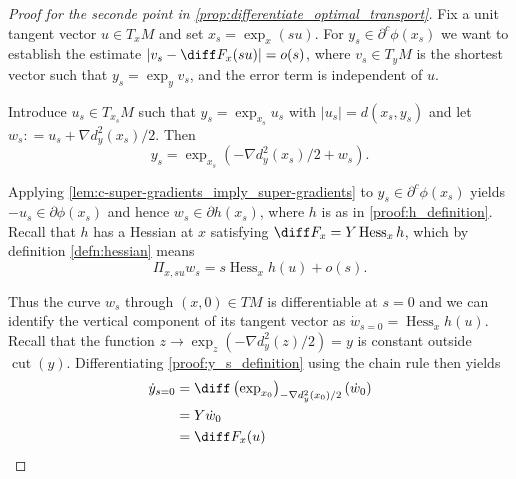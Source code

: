 \begin{proof}[Proof for the seconde point in \cref{prop:differentiate_optimal_transport}]
	Fix a unit tangent vector \( u \in T _ { x } M \) and set \( x _ { s } = \exp _ { x } ( s u ) \).
	For \( y _ { s } \in \partial ^ { c } \phi \left( x _ { s } \right) \) we want
	to establish the estimate \( \left| v _ { s } - \diff F _ { x } ( s u ) \right| = o ( s ) \),
	where \( v _ { s } \in T _ { y } M \) is the shortest vector such that
	\( y _ { s } = \exp _ { y } v _ { s } \),
	and the error term is independent of \( u \).

	Introduce \( u _ { s } \in T _ { x _ { s } } M \) such that \( y _ { s } = \exp _ { x _ { s } } u _ { s } \) with \( \left| u _ { s } \right| = d \left( x _ { s } , y _ { s } \right) \)
	and let \( w _ { s } : = u _ { s } + \nabla d _ { y } ^ { 2 } \left( x _ { s } \right) / 2 \).
	Then
	\begin{equation}
		\label{proof:y_s_definition}
		y _ { s } = \exp _ { x _ { s } }
		\left( - \nabla d _ { y } ^ { 2 } \left( x _ { s } \right) / 2 + w _ { s } \right).
	\end{equation}

	Applying  \cref{lem:c-super-gradients_imply_super-gradients} to \( y _ { s } \in \partial ^ { c } \phi \left( x _ { s } \right) \) yields \( - u _ { s } \in \partial \phi \left( x _ { s } \right) \)
	and hence
	\( w _ { s } \in \partial h \left( x _ { s } \right) \),
	where \( h \) is as in \cref{proof:h_definition}.
	Recall that \( h \) has a Hessian at \( x \) satisfying \( \diff F _ { x } = Y \operatorname { Hess } _ { x } h \),
	which by definition \cref{defn:hessian} means
	\begin{equation}
		\label{proof:hessian_definition}
		\Pi _ { x , s u } w _ { s } = s \operatorname{ Hess } _ { x } h ( u ) + o ( s ).
	\end{equation}

	Thus the curve \( w _ { s } \) through \( ( x , 0 ) \in T M \) is differentiable at \( s = 0 \)
	and we can
	identify the vertical component of its tangent vector as
	\( \dot { w } _ { s = 0 } = \operatorname { Hess } _ { x } h ( u ) . \)
	Recall that the function \( z \rightarrow \exp _ { z } \left( - \nabla d _ { y } ^ { 2 } ( z ) / 2 \right) = y \)
	is constant outside \( \operatorname{cut}( y ) \).
	Differentiating \cref{proof:y_s_definition} using the chain rule then yields
	\begin{align*}
		\dot { y } _ { s = 0 } & = \diff \left( \exp _ { x _ { 0 } } \right) _ { - \nabla d _ { y } ^ { 2 } \left( x _ { 0 } \right) / 2 } \left( \dot { w } _ { 0 } \right) \\ & = Y \dot { w } _ { 0 } \\ & = \diff F _ { x } ( u )
	\end{align*}


\end{proof}
